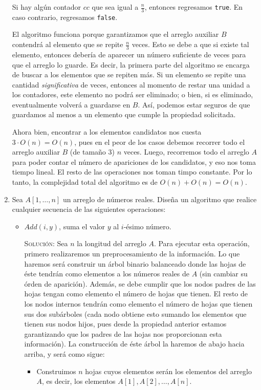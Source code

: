 \documentclass[letterpaper,11pt]{article}
\begin{document}
\begin{enumerate}
    Si hay algún contador $cc$ que sea igual a $\frac{n}{3}$, entonces 
    regresamos \texttt{true}. En caso contrario, regresamos \texttt{false}.

    El algoritmo funciona porque garantizamos que el arreglo auxiliar $B$ 
    contendrá al elemento que se repite $\frac{n}{3}$ veces. Esto se debe a 
    que si existe tal elemento, entonces debería de aparecer un número 
    suficiente de veces para que el arreglo lo guarde. Es decir, la primera 
    parte del algoritmo se encarga de buscar a los elementos que se repiten 
    más. Si un elemento se repite una cantidad \textit{significativa} de 
    veces, entonces al momento de restar una unidad a los contadores, 
    este elemento no podrá ser eliminado; o bien, si es eliminado, 
    eventualmente volverá a guardarse en $B$. Así, podemos estar seguros 
    de que guardamos al menos a un elemento que cumple la propiedad solicitada.

    Ahora bien, encontrar a los elementos candidatos nos cuesta 
    $3 \cdot O(n) = O(n)$, pues en el peor de los casos debemos recorrer todo 
    el arreglo auxiliar $B$ (de tamaño $3$) $n$ veces. Luego, recorremos 
    todo el arreglo $A$ para poder contar el número de apariciones de los 
    candidatos, y eso nos toma tiempo lineal. El resto de las operaciones nos 
    toman timpo constante. Por lo tanto, la complejidad total del algoritmo es 
    de $O(n) + O(n) = O(n)$.

    \item Sea $A[1, \ldots , n]$ un arreglo de números reales. Diseña un 
    algoritmo que realice cualquier secuencia de las siguientes operaciones:

	\begin{itemize}
        \item $Add(i, y)$,  suma el valor $y$ al $i$-ésimo número.

        \textsc{Solución:} Sea $n$ la longitud del arreglo $A$. Para ejecutar
        esta operación, primero realizaremos un preprocesamiento de la 
        información. Lo que haremos será construir un árbol binario balanceado 
        donde las hojas de éste tendrán como elementos a los números reales de 
        $A$ (sin cambiar su órden de aparición). Además, se debe cumplir que 
        los nodos padres de las hojas tengan como elemento el número de hojas 
        que tienen. El resto de los nodos internos tendrán como elemento el 
        número de hojas que tienen sus dos subárboles (cada nodo obtiene esto 
        sumando los elementos que tienen sus nodos hijos, pues desde la 
        propiedad anterior estamos garantizando que los padres de las hojas nos 
        proporcionan esta información). La construcción de éste árbol la haremos 
        de abajo hacia arriba, y será como sigue:
        \begin{itemize}
            \item Construimos $n$ hojas cuyos elementos serán los elementos del 
            arreglo $A$, es decir, los elementos $A[1], A[2], \ldots, A[n]$.


\end{itemize}
\end{itemize}
\end{enumerate}
\end{document}
